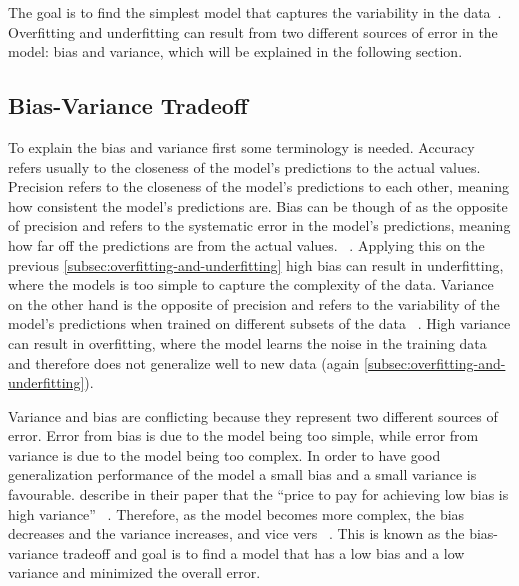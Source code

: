 The goal is to find the simplest model that captures the variability in the
data~\cite[p. 35]{muller2016introduction}.
Overfitting and underfitting can result from two different sources of error in the model: bias and variance, which
will be explained in the following section.

\subsection{Bias-Variance Tradeoff}\label{subsec:bias-variance-tradeoff}
To explain the bias and variance first some terminology is needed.
Accuracy refers usually to the closeness of the model's predictions to the actual values.
Precision refers to the closeness of the model's predictions to each other, meaning how consistent the model's
predictions
are.
Bias can be though of as the opposite of precision and refers to the systematic error in the model's predictions,
meaning how far off the predictions are from the actual values.
~\cite[p. 2]{doroudi2020bias}.
Applying this on the previous \cref{subsec:overfitting-and-underfitting} high bias can result in underfitting, where
the models is too simple to capture the complexity of the data.
Variance on the other hand is the opposite of precision and refers to the variability of the model's predictions when
trained on different subsets of the data
~\cite[p. 2]{doroudi2020bias}.
High variance can result in overfitting, where the model learns the noise in the training data and therefore does not
generalize well to new data (again \cref{subsec:overfitting-and-underfitting}).

Variance and bias are conflicting because they represent two different sources of error.
Error from bias is due to the model being too simple, while error from variance is due to the model being too
complex.
In order to have good generalization performance of the model a small bias and a small variance is favourable.
\cite{geman1992neural} describe in their paper that the ``price to pay for achieving low bias is high variance''
~\cite[p. 14]{geman1992neural}.
Therefore, as the model becomes more complex, the bias decreases and the variance increases, and vice vers
~\cite[p. 14]{geman1992neural}.
This is known as the bias-variance tradeoff and goal is to find a model that has a low bias and a low variance
and minimized the overall error.


